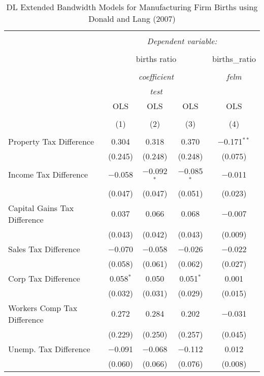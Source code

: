 
\begin{table}[!htbp] \centering 
  \caption{DL Extended Bandwidth Models for  Manufacturing Firm Births using Donald and Lang (2007)} 
  \label{} 
\begin{tabular}{@{\extracolsep{5pt}}lcccc} 
\\[-1.8ex]\hline 
\hline \\[-1.8ex] 
 & \multicolumn{4}{c}{\textit{Dependent variable:}} \\ 
\cline{2-5} 
\\[-1.8ex] & \multicolumn{3}{c}{births ratio} & births\_ratio \\ 
\\[-1.8ex] & \multicolumn{3}{c}{\textit{coefficient}} & \textit{felm} \\ 
 & \multicolumn{3}{c}{\textit{test}} & \textit{} \\ 
 & OLS & OLS & OLS & OLS \\ 
\\[-1.8ex] & (1) & (2) & (3) & (4)\\ 
\hline \\[-1.8ex] 
 Property Tax Difference & 0.304 & 0.318 & 0.370 & $-$0.171$^{**}$ \\ 
  & (0.245) & (0.248) & (0.248) & (0.075) \\ 
  Income Tax Difference & $-$0.058 & $-$0.092$^{*}$ & $-$0.085$^{*}$ & $-$0.011 \\ 
  & (0.047) & (0.047) & (0.051) & (0.023) \\ 
  Capital Gains Tax Difference & 0.037 & 0.066 & 0.068 & $-$0.007 \\ 
  & (0.043) & (0.042) & (0.043) & (0.009) \\ 
  Sales Tax Difference & $-$0.070 & $-$0.058 & $-$0.026 & $-$0.022 \\ 
  & (0.058) & (0.061) & (0.062) & (0.027) \\ 
  Corp Tax Difference & 0.058$^{*}$ & 0.050 & 0.051$^{*}$ & 0.001 \\ 
  & (0.032) & (0.031) & (0.029) & (0.015) \\ 
  Workers Comp Tax Difference & 0.272 & 0.284 & 0.202 & $-$0.031 \\ 
  & (0.229) & (0.250) & (0.257) & (0.045) \\ 
  Unemp. Tax Difference & $-$0.091 & $-$0.068 & $-$0.112 & 0.012 \\ 
  & (0.060) & (0.066) & (0.076) & (0.008) \\ 

\end{tabular}
\end{table}
